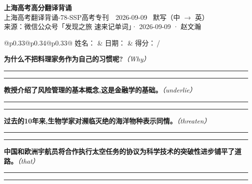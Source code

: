 \documentclass[11pt,a4paper]{article}
\newcommand{\num}[1]{\makebox[1.9em][r]{#1.}\hspace{0.3em}}
\newcommand{\wline}{\noindent\rule{\linewidth}{0.4pt}}
\newcommand{\prompt}[1]{\emph{\textcolor{tipblue}{\small（#1）}}}
\begin{document}
\pagestyle{plain}
\begin{center}
{\LARGE\bfseries 上海高考高分翻译背诵 }\\[0.25em]
{\large 上海高考翻译背诵-78-SSP高考专刊　2026-09-09 \quad\ 默写（中 $\to$ 英）}\\[0.35em]
{\footnotesize 来源：微信公众号「发现之旅 速来记单词」· 2026-09-09 · 赵文瀚}
\end{center}

\vspace{0.4em}
\noindent\begin{tabular}{@{}p{0.33\textwidth}@{}p{0.34\textwidth}@{}p{0.33\textwidth}@{}}
姓名：\underline{\hspace{2.0cm}} & 日期：\underline{\hspace{2.0cm}} & 得分：\underline{\hspace{1.4cm}}\,/ \\
\end{tabular}

\vspace{0.5em}

\vspace{0.8em}
\num{1}\textbf{为什么不把料理家务作为自己的习惯呢?}\prompt{Why}

\vspace{0.3em}

\wline\vspace{0.3em}
\wline

\num{2}\textbf{教授介绍了风险管理的基本概念,这是金融学的基础。}\prompt{underlie}

\vspace{0.3em}

\wline\vspace{0.3em}
\wline

\num{3}\textbf{过去的10年来,生物学家对濒临灭绝的海洋物种表示同情。}\prompt{threaten}

\vspace{0.3em}

\wline\vspace{0.3em}
\wline

\num{4}\textbf{中国和欧洲宇航员将合作执行太空任务的协议为科学技术的突破性进步铺平了道路。}\prompt{that}

\vspace{0.3em}

\wline\vspace{0.3em}
\wline
\end{document}
